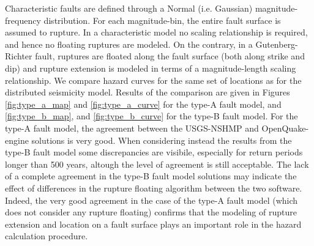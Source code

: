 Characteristic faults are defined through a Normal (i.e. Gaussian) magnitude-frequency distribution. For each magnitude-bin, the entire fault surface is assumed to rupture. In a characteristic model no scaling relationship is required, and hence no floating ruptures are modeled. On the contrary, in a Gutenberg-Richter fault, ruptures are floated along the fault surface (both along strike and dip) and rupture extension is modeled in terms of a magnitude-length scaling relationship. We compare hazard curves for the same set of locations as for the distributed seismicity model. Results of the comparison are given in Figures \ref{fig:type_a_map} and \ref{fig:type_a_curve} for the type-A fault model, and \ref{fig:type_b_map}, and \ref{fig:type_b_curve} for the type-B fault model. For the type-A fault model, the agreement between the USGS-NSHMP and OpenQuake-engine solutions is very good. When considering instead the results from the type-B fault model some discrepancies are visibile, especially for return periods longer than 500 years, altough the level of agreement is still acceptable. The lack of a complete agreement in the type-B fault model solutions may indicate the effect of differences in the rupture floating algorithm between the two software. Indeed, the very good agreement in the case of the type-A fault model (which does not consider any rupture floating) confirms that the modeling of rupture extension and location on a fault surface plays an important role in the hazard calculation procedure.

